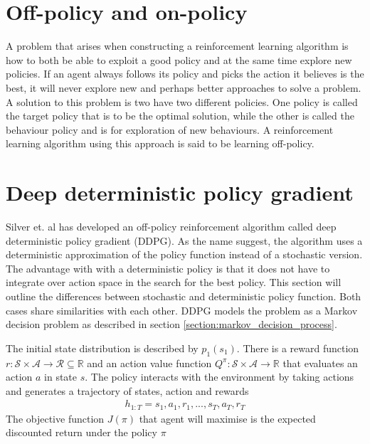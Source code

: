 \documentclass[class=book, crop=false]{standalone}
\begin{document}
\section{Off-policy and on-policy}
A problem that arises when constructing a reinforcement learning algorithm is how to both be able to exploit a good policy and at the same time explore new policies. If an agent always follows its policy and picks the action it believes is the best, it will never explore new and perhaps better approaches to solve a problem. A solution to this problem is two have two different policies. One policy is called the target policy that is to be the optimal solution, while the other is called the behaviour policy and is for exploration of new behaviours\cite{Sutton1998}. A reinforcement learning algorithm using this approach is said to be learning off-policy.

\section{Deep deterministic policy gradient}
Silver et. al has developed an off-policy reinforcement algorithm called deep deterministic policy gradient (DDPG)\cite{pmlr-v32-silver14}. As the name suggest, the algorithm uses a deterministic approximation of the policy function instead of a stochastic version. The advantage with with a deterministic policy is that it does not have to integrate over action space in the search for the best policy. This section will outline the differences between stochastic and deterministic policy function. Both cases share similarities with each other. DDPG models the problem as a Markov decision problem as described in section \ref{section:markov_decision_process}.

The initial state distribution is described by $p_{1}(s_{1})$. There is a reward function $r: \mathcal{S} \times \mathcal{A} \to \mathcal{R} \subseteq \mathbb{R}$ and an action value function $Q^{\pi}:\mathcal{S} \times \mathcal{A} \to \mathbb{R}$ that evaluates an action $a$ in state $s$. The policy interacts with the environment by taking actions and generates a trajectory of states, action and rewards 
\begin{equation}
   \begin{aligned}\label{eq:theory:trajectory2}
h_{1:T} = s_{1},a_{1},r_{1},..., s_{T},a_{T},r_{T}
\end{aligned} 
\end{equation}
The objective function $J(\pi)$ that agent will maximise is the expected discounted return under the policy $\pi$
\end{document}

